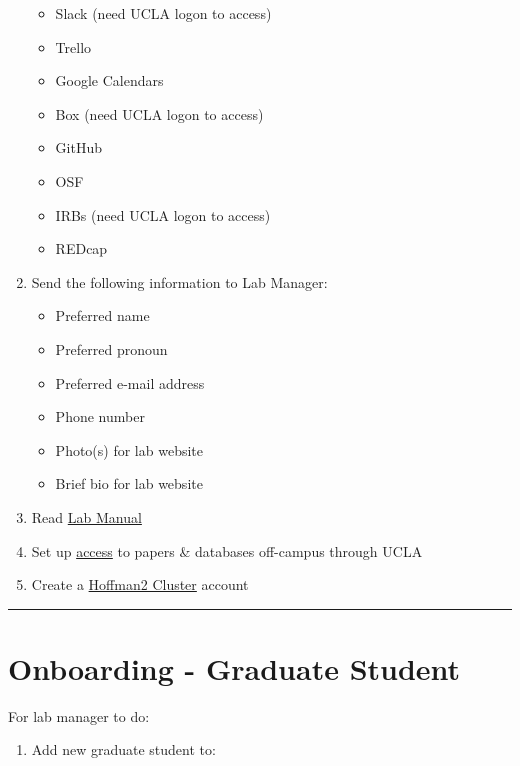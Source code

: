\documentclass[]{book}
\providecommand{\tightlist}{%
  \setlength{\itemsep}{0pt}\setlength{\parskip}{0pt}}
\begin{document}
\begin{enumerate}
  \begin{itemize}
  \tightlist
  \item
    Slack (need UCLA logon to access)
  \item
    Trello
  \item
    Google Calendars
  \item
    Box (need UCLA logon to access)
  \item
    GitHub
  \item
    OSF
  \item
    IRBs (need UCLA logon to access)
  \item
    REDcap
  \end{itemize}
\item
  Send the following information to Lab Manager:

  \begin{itemize}
  \tightlist
  \item
    Preferred name
  \item
    Preferred pronoun
  \item
    Preferred e-mail address
  \item
    Phone number
  \item
    Photo(s) for lab website
  \item
    Brief bio for lab website
  \end{itemize}
\item
  Read \href{https://bablab.github.io/lab_manual/}{Lab Manual}
\item
  Set up
  \href{https://www.library.ucla.edu/use/computers-computing-services/connect-campus}{access}
  to papers \& databases off-campus through UCLA
\item
  Create a \href{https://www.hoffman2.idre.ucla.edu/}{Hoffman2 Cluster}
  account
\end{enumerate}

\begin{center}\rule{0.5\linewidth}{0.5pt}\end{center}

\section{Onboarding - Graduate
Student}\label{onboarding---graduate-student}

For lab manager to do:

\begin{enumerate}
\def\labelenumi{\arabic{enumi}.}
\tightlist
\item
  Add new graduate student to:
\end{enumerate}
\end{document}
